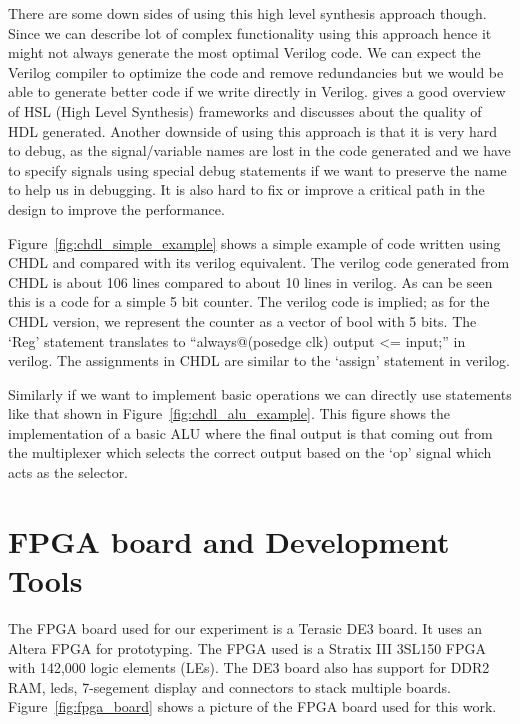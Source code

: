 There are some down sides of using this high level synthesis approach though. Since we can describe lot of complex functionality using this approach hence it might not always generate the most optimal Verilog code. We can expect the Verilog compiler to optimize the code and remove redundancies but we would be able to generate better code if we write directly in Verilog. \cite{hls_overview} gives a good overview of HSL (High Level Synthesis) frameworks and discusses about the quality of HDL generated. Another downside of using this approach is that it is very hard to debug, as the signal/variable names are lost in the code generated and we have to specify signals using special debug statements if we want to preserve the name to help us in debugging. It is also hard to fix or improve a critical path in the design to improve the performance.%

Figure~\ref{fig:chdl_simple_example} shows a simple example of code written using CHDL and compared with its verilog equivalent. The verilog code generated from CHDL is about 106 lines compared to about 10 lines in verilog. As can be seen this is a code for a simple 5 bit counter. The verilog code is implied; as for the CHDL version, we represent the counter as a vector of bool with 5 bits. The `Reg' statement translates to ``always@(posedge clk) output \textless= input;'' in verilog. The assignments in CHDL are similar to the `assign' statement in verilog.


Similarly if we want to implement basic operations we can directly use statements like that shown in Figure~\ref{fig:chdl_alu_example}. This figure shows the implementation of a basic ALU where the final output is that coming out from the multiplexer which selects the correct output based on the  `op' signal which acts as the selector.


\section{FPGA board and Development Tools}
The FPGA board used for our experiment is a Terasic DE3 board. It uses an Altera FPGA for prototyping. The FPGA used is a Stratix III 3SL150 FPGA with 142,000 logic elements (LEs). The DE3 board also has support for DDR2 RAM, leds, 7-segement display and connectors to stack multiple boards. Figure~\ref{fig:fpga_board} shows a picture of the FPGA board used for this work. 

